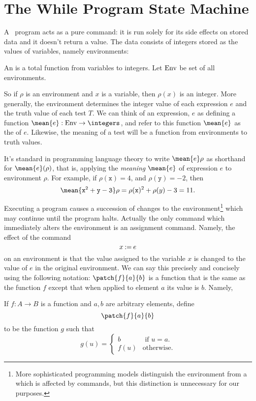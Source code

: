 \section{The \textbf{While} Program State Machine}

A \while\ program acts as a pure command: it is run solely for its
side effects on stored data and it doesn't return a value.  The data
consists of integers stored as the values of variables, namely
environments:
\begin{definition}
An  is a total function from variables to integers.
Let $\text{Env}$ be set of all environments.
\end{definition}
So if $\rho$ is an environment and $x$ is a variable, then $\rho(x)$ is an
integer.  More generally, the environment determines the integer value of
each expression $e$ and the truth value of each test $T$.  We can think
of an expression, $e$ as defining a function $\mean{e}:\Env \to
\integers$, and refer to this function $\mean{e}$ as the 
of $e$.  Likewise, the meaning of a test will be a function from
environments to truth values.

It's standard in programming language theory to write $\mean{e}\rho$
as shorthand for $\mean{e}(\rho)$, that is, applying
the \emph{meaning} $\mean{e}$ of expression $e$ to environment
$\rho$.  For example, if $\rho(\mathtt{x}) =4$, and $\rho(\mathtt{y})
=-2$, then
\begin{equation}\label{x2y311}
\mean{\mathtt{x^2+y -3}}\rho = \rho(\mathtt{x})^2 + \rho(y) -3 = 11.
\end{equation}

\iffalse
(A variable is a special case of an expression, so $\mean{x}\rho \eqdef \rho(x)$.)
\fi

Executing a program causes a succession of changes to the
environment\footnote{More sophisticated programming models distinguish
the environment from a  which is affected by commands, but
this distinction is unnecessary for our purposes.}  which may continue
until the program halts.  Actually the only command which immediately
alters the environment is an assignment command.  Namely, the effect
of the command
\[
x \mathbin{\mathtt{:=}} e
\]
on an environment is that the value assigned to the variable $x$ is
changed to the value of $e$ in the original environment.  We can say
this precisely and concisely using the following notation:
$\patch{f}{a}{b}$ is a function that is the same as the function $f$
except that when applied to element $a$ its value is $b$.  Namely,
\begin{definition}
If $f:A \to B$ is a function and $a,b$ are arbitrary elements, define
  \[
\patch{f}{a}{b}
\]
to be the function $g$ such that
\begin{equation*}
g(u) = \begin{cases}
         b & \text{ if } u = a.\\
         f(u) & \text{otherwise.}
       \end{cases}
\end{equation*}
\end{definition}

